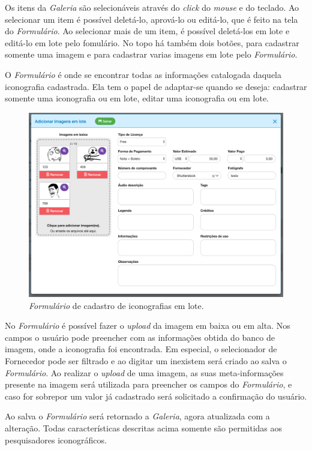 \documentclass[
  12pt,            %
  openany,
  oneside,
  a4paper,         %
  english,      %
  brazil
]{article}
\numberwithin{figure}{section}
\numberwithin{table}{section}
\begin{document}
Os itens da \textit{Galeria} são selecionáveis através do \textit{click} do \textit{mouse} e do teclado. Ao selecionar um item é possível deletá-lo, aprová-lo ou editá-lo, que é feito na tela do \textit{Formulário}. Ao selecionar mais de um item, é possível deletá-los em lote e editá-lo em lote pelo fomulário. No topo há também dois botões, para cadastrar somente uma imagem e para cadastrar varias imagens em lote pelo \textit{Formulário}.

O \textit{Formulário} é onde se encontrar todas as informações catalogada daquela iconografia cadastrada. Ela tem o papel de adaptar-se quando se deseja: cadastrar somente uma iconografia ou em lote, editar uma iconografia ou em lote.

\begin{figure}[H]
  \centering
  \includegraphics[width=0.9\linewidth]{iconr_formulario}
  \caption{\textit{Formulário} de cadastro de iconografias em lote.}
  \label{fig:iconr:formulario}
\end{figure}

No \textit{Formulário} é possível fazer o \textit{upload} da imagem em baixa ou em alta. Nos campos o usuário pode preencher com as informações obtida do banco de imagem, onde a iconografia foi encontrada. Em especial, o selecionador de Fornecedor pode ser filtrado e ao digitar um inexistem será criado ao salva o \textit{Formulário}. Ao realizar o \textit{upload} de uma imagem, as suas meta-informações presente na imagem será utilizada para preencher os campos do \textit{Formulário}, e caso for sobrepor um valor já cadastrado será solicitado a confirmação do usuário.

Ao salva o \textit{Formulário} será retornado a \textit{Galeria}, agora atualizada com a alteração. Todas características descritas acima somente são permitidas aos pesquisadores iconográficos.
\end{document}
